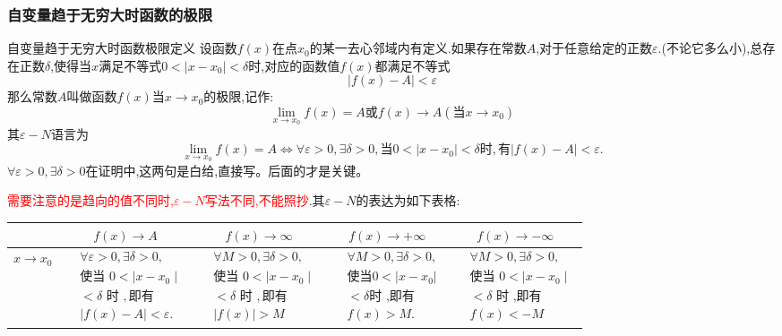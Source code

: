 \documentclass[10pt, a4paper, oneside, UTF8]{ctexbook}
\begin{document}
\begin{sloppypar}
    \subsubsection{自变量趋于无穷大时函数的极限}
    \begin{defn}{自变量趋于无穷大时函数极限定义}{}
        设函数$f(x)$在点$x_0$的某一去心邻域内有定义.如果存在常数$A$,对于任意给定的正数$\varepsilon$.(不论它多么小),总存在正数$\delta$,使得当$x$满足不等式$0<|x-x_0|<\delta$时,对应的函数值$f(x)$都满足不等式
        $$
            |f(x)-A|<\varepsilon
        $$
        那么常数$A$叫做函数$f(x)$当$x \to x_0$的极限,记作:
        $$
            \lim_{x\to x_0}f(x)=A\text{或}f(x)\to A(\text{当}x\to x_0)
        $$
        其$\varepsilon-N$语言为
        $$
            \lim\limits_{x\to x_0}f(x)=A\Leftrightarrow\forall\varepsilon>0,\exists\delta>0,\text{当}0<|x-x_0|<\delta\text{时},\text{有}|f(x)-A|<\varepsilon.
        $$
        $\forall\varepsilon>0,\exists\delta>0$在证明中,这两句是白给,直接写。后面的才是关键。
    \end{defn}
    \textcolor{red}{需要注意的是趋向的值不同时,$\varepsilon -N$写法不同,不能照抄}.其$\varepsilon -N$的表达为如下表格:
    \begin{center}
        \begin{tabular}{|c|c|c|c|c|}
            \hline
            & \textbf{$f(x)\to A$} & \textbf{$f(x)\to \infty$} & \textbf{$f(x)\to +\infty$} & \textbf{$f(x)\to -\infty$}\\
            \hline
            $x \to x_0$       & $\begin{aligned}&\forall\varepsilon>0,\exists\delta>0, \\&\text{使当 }0<\mid x-x_0\mid  \\&<\delta\text{ 时 },\text{即有} \\&|f(x)-A|<\varepsilon.\end{aligned}$ & $\begin{aligned}&\forall M>0,\exists\delta>0, \\&\text{使当 }0<\mid x-x_{0}\mid  \\&<\delta\text{ 时 },\text{即有}\\& |f(x)|>M\end{aligned}$ & $\begin{aligned}&\forall M>0,\exists\delta>0, \\&\text{使当} 0<|x-x_0| \\ &<\delta \text{时 ,即有} \\ &f(x)>M.\end{aligned}$      & $\begin{aligned}&\forall M>0,\exists\delta>0, \\&\text{使当 }0<\mid x-x_{0}\mid  \\&<\delta\text{ 时 ,即有}\\& f(x) <-M\end{aligned}$ \\ \hline

\end{tabular}
\end{center}
\end{sloppypar}
\end{document}
